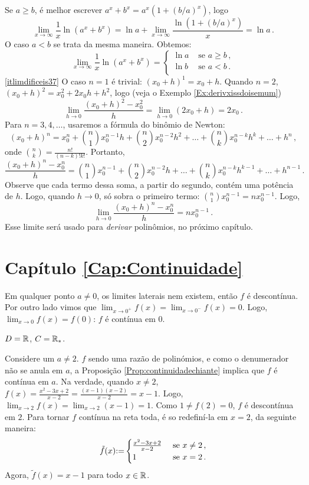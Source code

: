 \begin{Solution}{4.35}
Se $a\geq b$, é melhor escrever $a^x+b^x=a^x(1+(b/a)^x)$, logo
\[
\lim_{x\to\infty}\frac{1}{x}\ln(a^x+b^x)
=\ln a+
\lim_{x\to\infty}\frac{\ln(1+(b/a)^x)}{x}
=\ln a\,.
\]
O caso $a<b$ se trata da mesma maneira. Obtemos:
\[
\lim_{x\to\infty}\frac{1}{x}\ln(a^x+b^x)
=
\begin{cases}
\ln a&\text{ se }a\geq b\,,\\
\ln b&\text{ se }a< b\,.\\
\end{cases}
\]
\eqref{itlimdificeis37}
O caso $n=1$ é trivial: $(x_0+h)^1=x_0+h$. Quando $n=2$,
$(x_0+h)^2=x_0^2+2x_0h+h^2$, logo (veja o Exemplo
\ref{Ex:derivxissdoisemum})
$$
\lim_{h\to 0}\frac{(x_0+h)^2-x_0^2}{h}=
\lim_{h\to 0}(2x_0+h)=2x_0\,.
$$
Para $n=3,4,\dots$, usaremos a fórmula do binômio de
Newton:
$$(x_0+h)^n=x_0^n+\binom{n}{1}x_0^{n-1}h+\binom{n}{2}x_0^{n-2}
h^2+\dots+\binom{n}{k}x_0^{n-k} h^k+\dots+h^n\,,
$$
onde $\binom{n}{k}=\frac{n!}{(n-k)!k!}$. Portanto,
$$
\frac{(x_0+h)^n-x_0^n}{h}=\binom{n}{1}x_0^{n-1}+\binom{n}{2}x_0^{n-2}
h+\dots+\binom{n}{k}x_0^{n-k} h^{k-1}+\dots+h^{n-1}\,.
$$
Observe que cada termo dessa soma, a partir do segundo, contém
uma potência de $h$. Logo, quando $h\to 0$, só sobra
o primeiro termo: $\binom{n}{1}x_0^{n-1}=nx_0^{n-1}$. Logo,
\[
\lim_{h\to 0}\frac{(x_0+h)^n-x_0^n}{h}=nx_0^{n-1}\,.
\]
Esse limite será usado para \emph{derivar} polinômios, no próximo capítulo.
\end{Solution}
\protect \section *{Capítulo \ref {Cap:Continuidade}}
\begin{Solution}{5.1}
Em qualquer ponto $a\neq 0$, os limites laterais nem existem, então
$f$ é descontínua. Por outro lado vimos que $\lim_{x\to
0^+}f(x)=\lim_{x\to 0^- }f(x)=0$. Logo,
$\lim_{x\to 0}f(x)=f(0)$: $f$ é contínua em $0$.
\end{Solution}
\begin{Solution}{5.2}
$D=\mathbb{R}$, $C=\mathbb{R}_*$.
\end{Solution}
\begin{Solution}{5.3}
Considere um $a\neq 2$. $f$ sendo uma razão de polinómios, e como o denumerador não se
anula em $a$, a Proposição
\ref{Prop:continuidadechiante} implica que $f$ é contínua em $a$.
Na verdade, quando $x\neq 2$, $f(x)=\frac{x^2-3x+2}{x-2}=\frac{(x-1)(x-2)}{x-2}=x-1$.
Logo, $\lim_{x\to 2}f(x)=\lim_{x\to 2}(x-1)=1$. Como $1\neq f(2)=0$, $f$ é descontínua em
$2$.
Para tornar $f$ contínua na reta toda, é so redefiní-la em $x=2$, da seguinte maneira:
$$
\tilde{f}(x){:=}
\begin{cases}
\frac{x^2-3x+2}{x-2}&\text{ se }x\neq 2\,,\\
1&\text{ se }x=2\,.
\end{cases}
$$
Agora, $\tilde{f}(x)=x-1$ para todo $x\in \mathbb{R}$.
\end{Solution}
